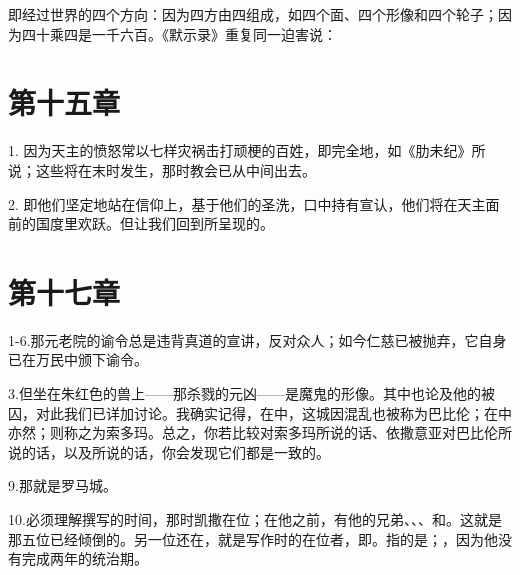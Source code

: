  即经过世界的四个方向：因为四方由四组成，如四个面、四个形像和四个轮子；因为四十乘四是一千六百。《默示录》重复同一迫害说：\par


\section{第十五章}

1.  因为天主的愤怒常以七样灾祸击打顽梗的百姓，即完全地，如《肋未纪》所说；这些将在末时发生，那时教会已从中间出去。\par

2.  即他们坚定地站在信仰上，基于他们的圣洗，口中持有宣认，他们将在天主面前的国度里欢跃。但让我们回到所呈现的。\par


\section{第十七章}

1-6.那元老院的谕令总是违背真道的宣讲，反对众人；如今仁慈已被抛弃，它自身已在万民中颁下谕令。\par

3.但坐在朱红色的兽上——那杀戮的元凶——是魔鬼的形像。其中也论及他的被囚，对此我们已详加讨论。我确实记得，在中，这城因混乱也被称为巴比伦；在中亦然；则称之为索多玛。总之，你若比较对索多玛所说的话、依撒意亚对巴比伦所说的话，以及所说的话，你会发现它们都是一致的。\par

9.那就是罗马城。\par

10.必须理解撰写的时间，那时凯撒在位；在他之前，有他的兄弟、、、和。这就是那五位已经倾倒的。另一位还在，就是写作时的在位者，即。指的是；，因为他没有完成两年的统治期。\par

